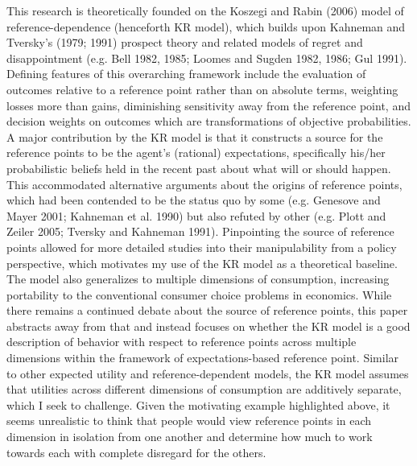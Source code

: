 \documentclass[
  12,
  letterpaper,
  DIV=11,
  numbers=noendperiod]{scrartcl}
\begin{document}
This research is theoretically founded on the Koszegi and Rabin (2006)
model of reference-dependence (henceforth KR model), which builds upon
Kahneman and Tversky's (1979; 1991) prospect theory and related models
of regret and disappointment (e.g. Bell 1982, 1985; Loomes and Sugden
1982, 1986; Gul 1991). Defining features of this overarching framework
include the evaluation of outcomes relative to a reference point rather
than on absolute terms, weighting losses more than gains, diminishing
sensitivity away from the reference point, and decision weights on
outcomes which are transformations of objective probabilities. A major
contribution by the KR model is that it constructs a source for the
reference points to be the agent's (rational) expectations, specifically
his/her probabilistic beliefs held in the recent past about what will or
should happen. This accommodated alternative arguments about the origins
of reference points, which had been contended to be the status quo by
some (e.g. Genesove and Mayer 2001; Kahneman et al. 1990) but also
refuted by other (e.g. Plott and Zeiler 2005; Tversky and Kahneman
1991). Pinpointing the source of reference points allowed for more
detailed studies into their manipulability from a policy perspective,
which motivates my use of the KR model as a theoretical baseline. The
model also generalizes to multiple dimensions of consumption, increasing
portability to the conventional consumer choice problems in economics.
While there remains a continued debate about the source of reference
points, this paper abstracts away from that and instead focuses on
whether the KR model is a good description of behavior with respect to
reference points across multiple dimensions within the framework of
expectations-based reference point. Similar to other expected utility
and reference-dependent models, the KR model assumes that utilities
across different dimensions of consumption are additively separate,
which I seek to challenge. Given the motivating example highlighted
above, it seems unrealistic to think that people would view reference
points in each dimension in isolation from one another and determine how
much to work towards each with complete disregard for the others.
\end{document}
